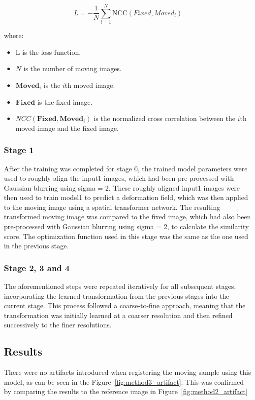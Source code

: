 \documentclass{report}
\begin{document}
	\begin{equation}
		L = -\frac{1}{N} \sum_{i=1}^N \text{NCC}(Fixed, Moved_i)
	\end{equation}

	where:
	\begin{itemize}
		\item $\text{L}$ is the loss function.
		\item $N$ is the number of moving images.
		\item $\mathbf{Moved}_i$ is the $i$th moved image.
		\item $\mathbf{Fixed}$ is the fixed image.
		\item $NCC(\mathbf{Fixed}, \mathbf{Moved}_i)$ is the normalized cross correlation between the $i$th moved image and the fixed image.
	\end{itemize}
	
	\subsubsection{Stage 1}
	After the training was completed for stage 0, the trained model parameters were used to roughly align the input1 images, which had been pre-processed with Gaussian blurring using sigma = 2. These roughly aligned input1 images were then used to train model1 to predict a deformation field, which was then applied to the moving image using a spatial transformer network. The resulting transformed moving image was compared to the fixed image, which had also been pre-processed with Gaussian blurring using sigma = 2, to calculate the similarity score. The optimization function used in this stage was the same as the one used in the previous stage.
	
	\subsubsection{Stage 2, 3 and 4}
	The aforementioned steps were repeated iteratively for all subsequent stages, incorporating the learned transformation from the previous stages into the current stage. This process followed a coarse-to-fine approach, meaning that the transformation was initially learned at a coarser resolution and then refined successively to the finer resolutions.
	
	\subsection{Results}
	There were no artifacts introduced when registering the moving sample using this model, as can be seen in the Figure~\ref{fig:method3_artifact}. This was confirmed by comparing the results to the reference image in Figure~\ref{fig:method2_artifact}
	
\end{document}

